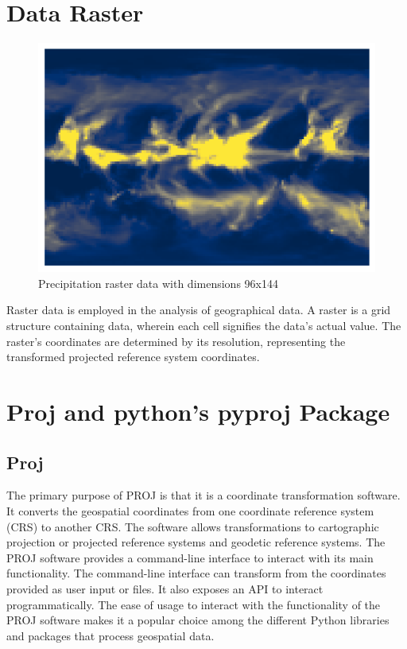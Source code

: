 \section{Data Raster}
\begin{figure}[h]
    \centering
    \includegraphics[width=0.75\linewidth]{figures/chapter-7/precipitation_raster_thesis.png}
    \caption{Precipitation raster data with dimensions 96x144}
    \label{fig:precipitation-raster}
\end{figure}
Raster data is employed in the analysis of geographical data. A raster is a grid structure containing data, wherein each cell signifies the data's actual value. The raster's coordinates are determined by its resolution, representing the transformed projected reference system coordinates.


\section{Proj and python's pyproj Package}


\subsection{Proj}
The primary purpose of PROJ is that it is a coordinate transformation
software. It converts the geospatial coordinates from one coordinate reference system (CRS) to another CRS. The software allows transformations to cartographic projection or projected reference systems and geodetic reference systems. The PROJ software provides a command-line interface to interact with its main functionality. The command-line interface can transform from the coordinates provided as user input or files. It also exposes an API to interact programmatically. The ease of usage to interact with the functionality of the PROJ software makes it a popular choice among the different Python libraries and packages that process geospatial data.

